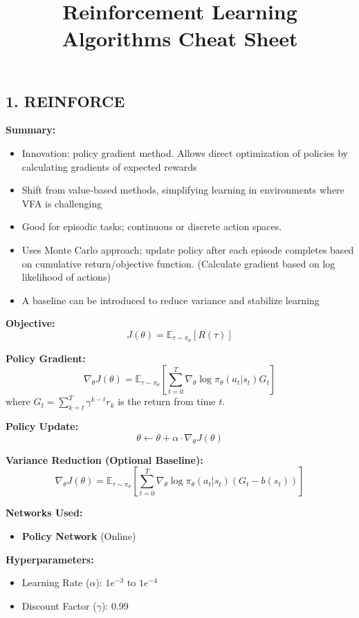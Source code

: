 \documentclass[a4paper,10pt]{article}
\title{\vspace{-4cm}Reinforcement Learning Algorithms Cheat Sheet}
\author{}
\date{}
\begin{document}
\maketitle
\small
\begin{multicols}{2}

\section*{1. REINFORCE}
\textbf{Summary:}
\begin{itemize}
    \item Innovation: policy gradient method. Allows direct optimization of policies by calculating gradients of expected rewards
    \item Shift from value-based methods, simplifying learning in environments where VFA is challenging
    \item Good for episodic tasks; continuous or discrete action spaces.
    \item Uses Monte Carlo approach; update policy after each episode completes based on cumulative return/objective function. (Calculate gradient based on log likelihood of actions)
    \item A baseline can be introduced to reduce variance and stabilize learning
\end{itemize}

\noindent \textbf{Objective:}
\[
J(\theta) = \mathbb{E}_{\tau \sim \pi_\theta} \left[ R(\tau) \right]
\]

\noindent \textbf{Policy Gradient:}
\[
\nabla_\theta J(\theta) = \mathbb{E}_{\tau \sim \pi_\theta} \left[ \sum_{t=0}^{T} \nabla_\theta \log \pi_\theta(a_t | s_t) G_t \right]
\]
where \( G_t = \sum_{k=t}^{T} \gamma^{k-t} r_k \) is the return from time \( t \).

\noindent \textbf{Policy Update:}
\[
\theta \leftarrow \theta + \alpha \cdot \nabla_\theta J(\theta)
\]

\noindent \textbf{Variance Reduction (Optional Baseline):}
\[
\nabla_\theta J(\theta) = \mathbb{E}_{\tau \sim \pi_\theta} \left[ \sum_{t=0}^{T} \nabla_\theta \log \pi_\theta(a_t | s_t) \left( G_t - b(s_t) \right) \right]
\]

\noindent \textbf{Networks Used:} 
\begin{itemize}
    \item \textbf{Policy Network} (Online)
\end{itemize}

\noindent \textbf{Hyperparameters:}
\begin{itemize}
    \item Learning Rate (\(\alpha\)): \(1e^{-3}\) to \(1e^{-4}\)
    \item Discount Factor (\(\gamma\)): 0.99
\end{itemize}


\end{multicols}
\end{document}
